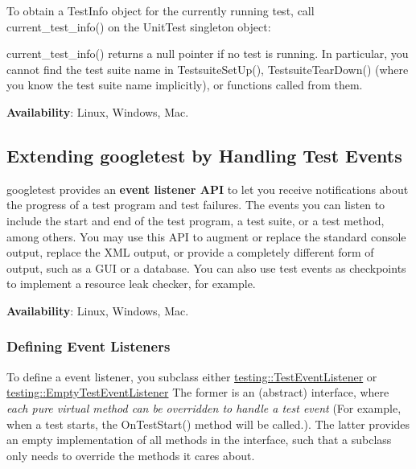 To obtain a {\ttfamily Test\+Info} object for the currently running test, call {\ttfamily current\+\_\+test\+\_\+info()} on the {\ttfamily Unit\+Test} singleton object\+:


\begin{DoxyCode}{0}
\DoxyCodeLine{}
\DoxyCodeLine{}
\DoxyCodeLine{}
\end{DoxyCode}


{\ttfamily current\+\_\+test\+\_\+info()} returns a null pointer if no test is running. In particular, you cannot find the test suite name in {\ttfamily Testsuite\+Set\+Up()}, {\ttfamily Testsuite\+Tear\+Down()} (where you know the test suite name implicitly), or functions called from them.

{\bfseries{Availability}}\+: Linux, Windows, Mac.

\subsection*{Extending googletest by Handling Test Events}

googletest provides an {\bfseries{event listener A\+PI}} to let you receive notifications about the progress of a test program and test failures. The events you can listen to include the start and end of the test program, a test suite, or a test method, among others. You may use this A\+PI to augment or replace the standard console output, replace the X\+ML output, or provide a completely different form of output, such as a G\+UI or a database. You can also use test events as checkpoints to implement a resource leak checker, for example.

{\bfseries{Availability}}\+: Linux, Windows, Mac.

\subsubsection*{Defining Event Listeners}

To define a event listener, you subclass either \mbox{\hyperlink{classtesting_1_1_test_event_listener}{testing\+::\+Test\+Event\+Listener}} or \mbox{\hyperlink{classtesting_1_1_empty_test_event_listener}{testing\+::\+Empty\+Test\+Event\+Listener}} The former is an (abstract) interface, where {\itshape each pure virtual method can be overridden to handle a test event} (For example, when a test starts, the {\ttfamily On\+Test\+Start()} method will be called.). The latter provides an empty implementation of all methods in the interface, such that a subclass only needs to override the methods it cares about.

